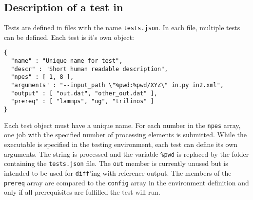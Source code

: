 \subsection{Description of a test in \JSON}

Tests are defined in \JSON files with the name \lstinline[style=SHELL]|tests.json|. In each file, multiple tests can be defined. Each test is it's own \JSON object:

\begin{lstlisting}[style=SHELL_SMALL,frame=lines]
{
  "name" : "Unique_name_for_test",
  "descr" : "Short human readable description",
  "npes" : [ 1, 8 ],
  "arguments" : "--input_path \"%pwd:%pwd/XYZ\" in.py in2.xml",
  "output" : [ "out.dat", "other_out.dat" ],
  "prereq" : [ "lammps", "ug", "trilinos" ]
}
\end{lstlisting}

Each \JSON test object must have a unique name. For each number in the \lstinline[style=SHELL]|npes| array, one job with the specified number of processing elements is submitted. While the executable is specified in the testing environment, each test can define its own arguments. The string is processed and the variable \lstinline[style=SHELL]|%pwd| is replaced by the folder containing the \lstinline[style=SHELL]|tests.json| file. The \lstinline[style=SHELL]|out| member is currently unused but is intended to be used for \lstinline[style=SHELL]|diff|'ing with reference output. The members of the \lstinline[style=SHELL]|prereq| array are compared to the \lstinline[style=SHELL]|config| array in the environment definition and only if all prerequisites are fulfilled the test will run.
